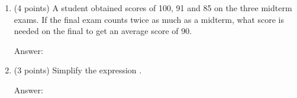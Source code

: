 \documentclass[11pt]{article}
\begin{document}
\begin{enumerate}
\vfill
\item (4 points) A student obtained scores of 100, 91 and 85 on the three midterm exams. If the final exam counts twice as much as a midterm, what score is needed on the final to get an average score of 90. \\
\begin{flushright}{Answer: \underline{\hspace{2in}}}\end{flushright}

\vfill
\item (3 points) Simplify  the expression .
\begin{flushright}{Answer: \underline{\hspace{2in}}}\end{flushright}

\vfill
\end{enumerate}
\end{document}
